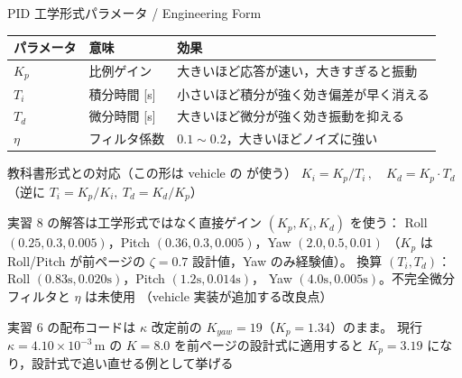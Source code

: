 \begin{frame}{PID 工学形式パラメータ / Engineering Form}
  \begin{table}
    \centering\scriptsize
    \renewcommand{\arraystretch}{0.95}
    \begin{tabular}{llp{58mm}}
      \hline
      \textbf{パラメータ} & \textbf{意味} & \textbf{効果} \\
      \hline
      $K_p$  & 比例ゲイン   & 大きいほど応答が速い，大きすぎると振動 \\
      $T_i$  & 積分時間 [s] & 小さいほど積分が強く効き偏差が早く消える \\
      $T_d$  & 微分時間 [s] & 大きいほど微分が強く効き振動を抑える \\
      $\eta$ & フィルタ係数  & $0.1\sim0.2$，大きいほどノイズに強い \\
      \hline
    \end{tabular}
  \end{table}

  \vspace{-0.35em}
  \begin{block}{教科書形式との対応（この形は vehicle の  が使う）}\footnotesize
    $K_i = K_p / T_i\,,\quad K_d = K_p \cdot T_d$（逆に $T_i = K_p/K_i,\ T_d = K_d/K_p$）
  \end{block}

  \vspace{-0.3em}
  {\scriptsize 実習 8 の解答は工学形式ではなく直接ゲイン $(K_p,K_i,K_d)$ を使う：
  Roll $(0.25,0.3,0.005)$，Pitch $(0.36,0.3,0.005)$，Yaw $(2.0,0.5,0.01)$
  （$K_p$ は Roll/Pitch が前ページの $\zeta=0.7$ 設計値，Yaw のみ経験値）。
  換算 $(T_i,T_d)$：Roll $(0.83\text{s},0.020\text{s})$，Pitch $(1.2\text{s},0.014\text{s})$，
  Yaw $(4.0\text{s},0.005\text{s})$。不完全微分フィルタと $\eta$ は未使用
  （vehicle 実装が追加する改良点）}
  \par
  {\scriptsize 実習 6 の配布コードは $\kappa$ 改定前の $K_{yaw}=19$（$K_p=1.34$）のまま。
  現行 $\kappa=4.10\times10^{-3}$\,m の $K=8.0$ を前ページの設計式に適用すると
  $K_p=3.19$ になり，設計式で追い直せる例として挙げる}
\end{frame}

